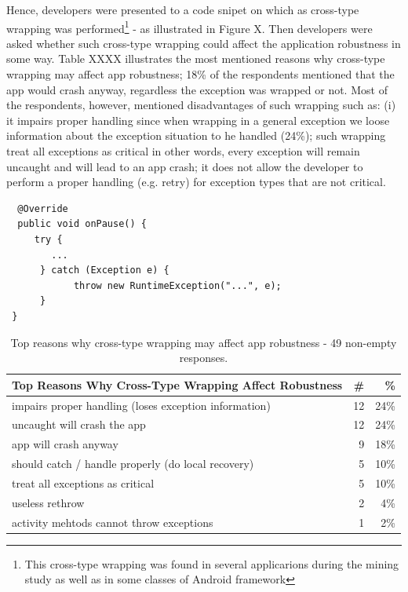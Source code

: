 Hence, developers were presented to a code snipet on which as cross-type wrapping was performed\footnote{This cross-type wrapping was found in several applicarions during the mining study as well as in some classes of Android framework} - as illustrated in Figure X. Then developers were asked whether such cross-type wrapping could affect the application robustness in some way. Table XXXX illustrates the  most mentioned reasons why cross-type wrapping may affect app robustness; 18\% of the respondents mentioned that the app would crash anyway, regardless the exception was wrapped or not. Most of the respondents, however, mentioned disadvantages of such wrapping such as: (i) it impairs proper handling since when wrapping in a general exception we loose information about the exception situation to he handled (24\%); such wrapping treat all exceptions as critical in other words, every exception will remain uncaught and will lead to an app crash; it does not allow the developer to perform a proper handling (e.g. retry) for exception types that are not critical. 		

{\footnotesize
\begin{verbatim}
  @Override
  public void onPause() {
     try {
        ...
      } catch (Exception e) {
            throw new RuntimeException("...", e);
      }
 }
\end{verbatim}
}

\begin{table}
\scriptsize
\centering
\begin{tabular}{lrr}
\hline
\bfseries{Top Reasons Why Cross-Type Wrapping Affect Robustness} & \bfseries{\#} & \bfseries{\%} \\
\hline
impairs proper handling (loses exception information)	& 12 &	24\% \\
uncaught will crash the app	& 12 &	24\% \\
app will crash anyway	& 9	& 18\% \\
should catch / handle properly (do local recovery)	 & 5 & 	10\% \\
treat all exceptions as critical	& 5 &	10\% \\
useless rethrow	& 2 &	4\% \\
activity mehtods cannot throw exceptions &	1 &	2\% \\

\hline
\end{tabular}
\caption{Top reasons why cross-type wrapping may affect app robustness - 49 non-empty responses. }
\label{tab:handlingruntime}
\end{table}

